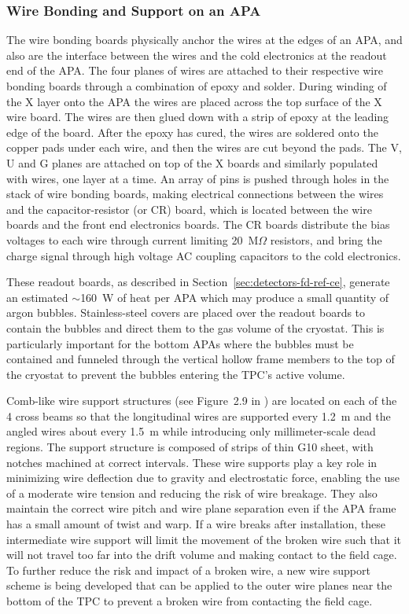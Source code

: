 \subsubsection{Wire Bonding and Support on an APA}
\label{subsec:fd-ref-wirewrap}


The wire bonding boards physically anchor the wires at the edges of an APA, and also are the interface between the wires and the cold electronics  at the readout end of the APA.  The four planes of wires are attached to their respective wire bonding boards through a combination of epoxy and solder. During winding of the X layer onto the APA the wires are placed across the top surface of the X wire board. The wires are then glued down with a strip of epoxy at the leading edge of the board.  After the epoxy has cured, the wires are soldered onto the copper pads under each wire, and then the wires are cut beyond the pads. The V, U and G planes are attached on top of the X boards and similarly populated with wires, one layer at a time. An array of pins is pushed through holes in the stack of wire bonding boards, making electrical connections between the wires and the capacitor-resistor (or CR) board, which is located between the wire boards and the front end electronics boards.  The CR boards distribute the bias voltages to each wire through current limiting 20~M$\Omega$ resistors,  and bring the charge signal through high voltage AC coupling capacitors to the cold electronics.

These readout boards, as described in Section~\ref{sec:detectors-fd-ref-ce}, generate an estimated $\sim$160~W of heat per APA which may produce a small quantity of argon bubbles.  Stainless-steel covers are placed over the readout boards to contain the bubbles and direct them to the gas volume of the cryostat. This is particularly important for the bottom APAs where the bubbles must be contained and funneled through the vertical hollow frame members to the top of the cryostat to prevent the bubbles entering the TPC's active volume.

Comb-like wire support structures (see Figure~2.9 in \anxlbnefd) are located on each of the 4 cross beams so that the longitudinal wires are supported every 1.2~m and the angled wires about every 1.5~m while introducing only millimeter-scale dead regions. The support structure is composed of strips of thin G10 sheet, with notches machined at correct intervals.  These wire supports play a key role in minimizing wire deflection due to gravity and electrostatic force, enabling the use of a moderate wire tension and reducing the risk of wire breakage.   They also maintain the correct wire pitch and wire plane separation even if the APA frame has a small amount of twist and warp.  If a wire breaks after installation, these intermediate wire support will limit the movement of the broken wire such that it will not travel too far into the drift volume and making contact to the field cage.  To further reduce the risk and impact of a broken wire, a new wire support scheme is being developed that can be applied to the outer wire planes near the bottom of the TPC to prevent a broken wire from contacting the field cage. 


